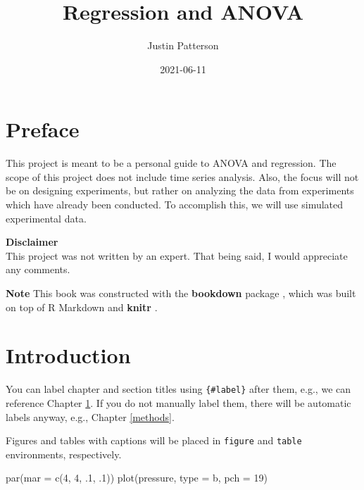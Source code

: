 \documentclass[
]{book}
\title{Regression and ANOVA}
\author{Justin Patterson}
\date{2021-06-11}
\newenvironment{Shaded}{\begin{snugshade}}{\end{snugshade}}
\newcommand{\AttributeTok}[1]{\textcolor[rgb]{0.77,0.63,0.00}{#1}}
\newcommand{\DecValTok}[1]{\textcolor[rgb]{0.00,0.00,0.81}{#1}}
\newcommand{\FunctionTok}[1]{\textcolor[rgb]{0.00,0.00,0.00}{#1}}
\newcommand{\NormalTok}[1]{#1}
\newcommand{\StringTok}[1]{\textcolor[rgb]{0.31,0.60,0.02}{#1}}
\begin{document}
\maketitle

{
\setcounter{tocdepth}{1}
\tableofcontents
}
\hypertarget{preface}{%
\chapter*{Preface}\label{preface}}

This project is meant to be a personal guide to ANOVA and regression. The scope of this project does not include time series analysis. Also, the focus will not be on designing experiments, but rather on analyzing the data from experiments which have already been conducted. To accomplish this, we will use simulated experimental data.

\textbf{Disclaimer}\\
This project was not written by an expert. That being said, I would appreciate any comments.

\textbf{Note}
This book was constructed with the \textbf{bookdown} package \autocite{R-bookdown}, which was built on top of R Markdown and \textbf{knitr} \autocite{xie2015}.

\hypertarget{intro}{%
\chapter{Introduction}\label{intro}}

You can label chapter and section titles using \texttt{\{\#label\}} after them, e.g., we can reference Chapter \ref{intro}. If you do not manually label them, there will be automatic labels anyway, e.g., Chapter \ref{methods}.

Figures and tables with captions will be placed in \texttt{figure} and \texttt{table} environments, respectively.

\begin{Shaded}
\begin{Highlighting}[]
\FunctionTok{par}\NormalTok{(}\AttributeTok{mar =} \FunctionTok{c}\NormalTok{(}\DecValTok{4}\NormalTok{, }\DecValTok{4}\NormalTok{, .}\DecValTok{1}\NormalTok{, .}\DecValTok{1}\NormalTok{))}
\FunctionTok{plot}\NormalTok{(pressure, }\AttributeTok{type =} \StringTok{\textquotesingle{}b\textquotesingle{}}\NormalTok{, }\AttributeTok{pch =} \DecValTok{19}\NormalTok{)}
\end{Highlighting}
\end{Shaded}
\end{document}
